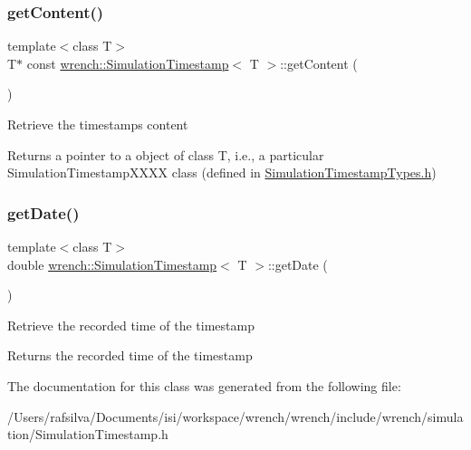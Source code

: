 \subsubsection{\texorpdfstring{get\+Content()}{getContent()}}
{\footnotesize\ttfamily template$<$class T$>$ \\
T$\ast$ const \hyperlink{classwrench_1_1_simulation_timestamp}{wrench\+::\+Simulation\+Timestamp}$<$ T $>$\+::get\+Content (\begin{DoxyParamCaption}{ }\end{DoxyParamCaption})\hspace{0.3cm}{\ttfamily [inline]}}

Retrieve the timestamp\textquotesingle{}s content

\begin{DoxyReturn}{Returns}
a pointer to a object of class T, i.\+e., a particular Simulation\+Timestamp\+X\+X\+XX class (defined in \hyperlink{_simulation_timestamp_types_8h_source}{Simulation\+Timestamp\+Types.\+h}) 
\end{DoxyReturn}
\mbox{\label{classwrench_1_1_simulation_timestamp_a706030fdac38ad1e853e588f7260c499}} 
\subsubsection{\texorpdfstring{get\+Date()}{getDate()}}
{\footnotesize\ttfamily template$<$class T$>$ \\
double \hyperlink{classwrench_1_1_simulation_timestamp}{wrench\+::\+Simulation\+Timestamp}$<$ T $>$\+::get\+Date (\begin{DoxyParamCaption}{ }\end{DoxyParamCaption})\hspace{0.3cm}{\ttfamily [inline]}}

Retrieve the recorded time of the timestamp

\begin{DoxyReturn}{Returns}
the recorded time of the timestamp 
\end{DoxyReturn}


The documentation for this class was generated from the following file\+:\begin{DoxyCompactItemize}
\item 
/\+Users/rafsilva/\+Documents/isi/workspace/wrench/wrench/include/wrench/simulation/Simulation\+Timestamp.\+h\end{DoxyCompactItemize}
